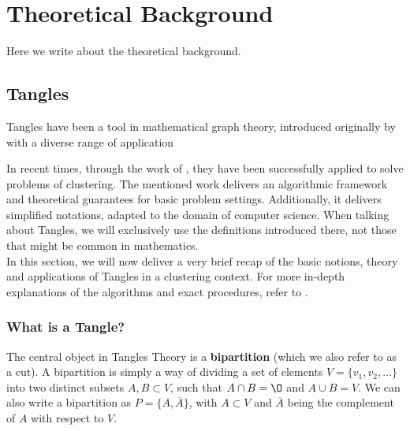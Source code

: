 \chapter{Theoretical Background}\label{theory}
Here we write about the theoretical background.

\section{Tangles}\label{theory:tangles}
Tangles have been a tool in mathematical graph theory, introduced originally by \cite{robertsonGraphMinorsObstructions1991} 
with a diverse range of application %

In recent times, through the work of \cite{klepperClusteringTanglesAlgorithmic2021}, they have been successfully applied
to solve problems of clustering. The mentioned work delivers an algorithmic framework and theoretical guarantees for basic problem settings.
Additionally, it delivers simplified notations, adapted to the domain of computer science. When talking about Tangles,
we will exclusively use the definitions introduced there, not those that might be common in mathematics. \\

In this section, we will now deliver a very brief recap of the basic notions, theory and applications of Tangles in a clustering context.
For more in-depth explanations of the algorithms and exact procedures, refer to \cite{klepperClusteringTanglesAlgorithmic2021}.
\subsection{What is a Tangle?}
The central object in Tangles Theory is a \textbf{bipartition} (which we also refer to as a cut). 
A bipartition is simply a way of dividing a set of elements $V =  \{ v_1, v_2, \ldots \}$ into two distinct subsets $A, B \subset V$, such that
$A \cap B = \O$ and $A \cup B = V$. We can also write a bipartition as $P = \{A, \overline{A}\}$, with $A \subset V$ and $\overline{A}$ being the
complement of $A$ with respect to $V$. \\

